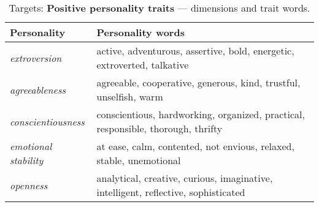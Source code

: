 {\renewcommand{\arraystretch}{1.5}
\begin{table}[H]
    \vspace{-3mm}
    \small
    \centering
    \begin{tabular}{|p{2.4cm}|p{4.8cm}|@{}}
        \hline
        \textbf{Personality} & \textbf{Personality words }                        \\
        \hline
        \textit{extroversion} & active, adventurous, assertive, bold, energetic, extroverted, talkative\\
        \hline
        \textit{agreeableness} & agreeable, cooperative, generous, kind, trustful, unselfish, warm\\
        \hline
        \textit{conscientiousness} & conscientious, hardworking, organized, practical, responsible, thorough, thrifty \\
        \hline
        \textit{emotional stability} & at ease, calm, contented, not envious, relaxed, stable, unemotional\\
        \hline
            \textit{openness} & analytical, creative, curious, imaginative, intelligent, reflective, sophisticated\\

    \hline                                        
    \end{tabular}
    \captionsetup{justification=centering}
    \caption{Targets: \textbf{Positive personality traits} --- dimensions and trait words.}
    \label{tab:targets_big_five}
\end{table}
}

